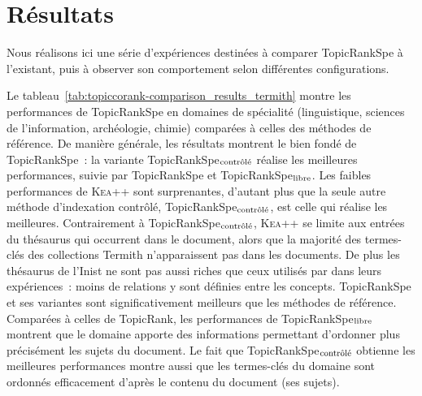 \section{Résultats}
\label{sec:main-domain_specific_keyphrase_annotation-supervised_automatic_keyphrase_annotation-evaluation-topiccorank_specific_domains}
  Nous réalisons ici une série d'expériences destinées à comparer
  TopicRankSpe à l'existant, puis à observer son comportement selon
  différentes configurations.

  Le tableau~\ref{tab:topiccorank-comparison_results_termith} montre les
  performances de TopicRankSpe en domaines de spécialité (linguistique,
  sciences de l'information, archéologie, chimie) comparées à celles des
  méthodes de référence. De manière générale, les résultats montrent le
  bien fondé de TopicRankSpe~: la variante
  TopicRankSpe$_\textnormal{contrôlé}$ réalise les meilleures performances,
  suivie par TopicRankSpe et TopicRankSpe$_\textnormal{libre}$. Les faibles
  performances de \textsc{Kea++} sont surprenantes, d'autant plus que la
  seule autre méthode d'indexation contrôlé, TopicRankSpe$_\textnormal{contrôlé}$,
  est celle qui réalise les meilleures. Contrairement à
  TopicRankSpe$_\textnormal{contrôlé}$, \textsc{Kea++} se limite aux entrées
  du thésaurus qui occurrent dans le document, alors que la majorité des
  termes-clés des collections Termith n'apparaissent pas dans les
  documents. De plus les thésaurus de l'Inist ne sont pas aussi riches que
  ceux utilisés par  dans leurs expériences~:
  moins de relations y sont définies entre les concepts. TopicRankSpe et
  ses variantes sont significativement meilleurs que les méthodes de
  référence. Comparées à celles de TopicRank, les performances de
  TopicRankSpe$_\textnormal{libre}$ montrent que le domaine apporte des
  informations permettant d'ordonner plus précisément les sujets du
  document. Le fait que TopicRankSpe$_\textnormal{contrôlé}$ obtienne les
  meilleures performances montre aussi que les termes-clés du domaine sont
  ordonnés efficacement d'après le contenu du document (ses sujets).
